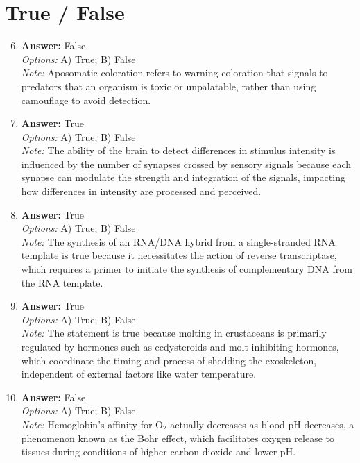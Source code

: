\documentclass[12pt]{article}
\begin{document}
\section*{True / False}
\begin{enumerate}[label=\arabic*.]
\setcounter{enumi}{5}
\item \textbf{Answer:} False
\\ \textit{Options:} A) True; B) False
\\ \textit{Note:} Aposomatic coloration refers to warning coloration that signals to predators that an organism is toxic or unpalatable, rather than using camouflage to avoid detection.
\item \textbf{Answer:} True
\\ \textit{Options:} A) True; B) False
\\ \textit{Note:} The ability of the brain to detect differences in stimulus intensity is influenced by the number of synapses crossed by sensory signals because each synapse can modulate the strength and integration of the signals, impacting how differences in intensity are processed and perceived.
\item \textbf{Answer:} True
\\ \textit{Options:} A) True; B) False
\\ \textit{Note:} The synthesis of an RNA/DNA hybrid from a single-stranded RNA template is true because it necessitates the action of reverse transcriptase, which requires a primer to initiate the synthesis of complementary DNA from the RNA template.
\item \textbf{Answer:} True
\\ \textit{Options:} A) True; B) False
\\ \textit{Note:} The statement is true because molting in crustaceans is primarily regulated by hormones such as ecdysteroids and molt-inhibiting hormones, which coordinate the timing and process of shedding the exoskeleton, independent of external factors like water temperature.
\item \textbf{Answer:} False
\\ \textit{Options:} A) True; B) False
\\ \textit{Note:} Hemoglobin's affinity for O$_{2}$ actually decreases as blood pH decreases, a phenomenon known as the Bohr effect, which facilitates oxygen release to tissues during conditions of higher carbon dioxide and lower pH.
\end{enumerate}
\end{document}
